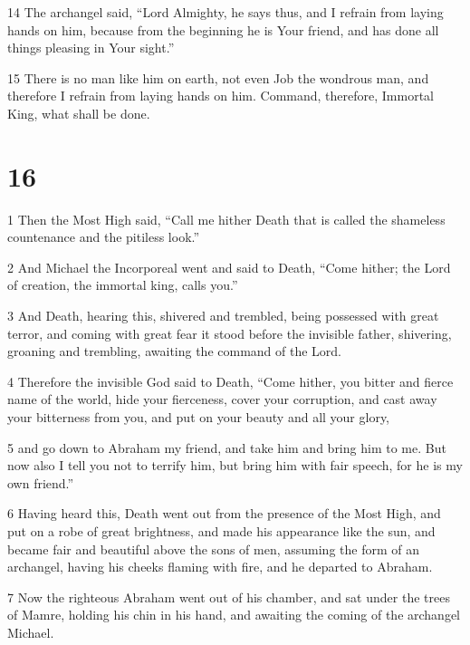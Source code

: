 \par 14 The archangel said, “Lord Almighty, he says thus, and I refrain from laying hands on him, because from the beginning he is Your friend, and has done all things pleasing in Your sight.” 

\par 15 There is no man like him on earth, not even Job the wondrous man, and therefore I refrain from laying hands on him. Command, therefore, Immortal King, what shall be done.

\chapter{16}

\par 1 Then the Most High said, “Call me hither Death that is called the shameless countenance and the pitiless look.” 

\par 2 And Michael the Incorporeal went and said to Death, “Come hither; the Lord of creation, the immortal king, calls you.” 

\par 3 And Death, hearing this, shivered and trembled, being possessed with great terror, and coming with great fear it stood before the invisible father, shivering, groaning and trembling, awaiting the command of the Lord. 

\par 4 Therefore the invisible God said to Death, “Come hither, you bitter and fierce name of the world, hide your fierceness, cover your corruption, and cast away your bitterness from you, and put on your beauty and all your glory, 

\par 5 and go down to Abraham my friend, and take him and bring him to me. But now also I tell you not to terrify him, but bring him with fair speech, for he is my own friend.” 

\par 6 Having heard this, Death went out from the presence of the Most High, and put on a robe of great brightness, and made his appearance like the sun, and became fair and beautiful above the sons of men, assuming the form of an archangel, having his cheeks flaming with fire, and he departed to Abraham. 

\par 7 Now the righteous Abraham went out of his chamber, and sat under the trees of Mamre, holding his chin in his hand, and awaiting the coming of the archangel Michael. 

